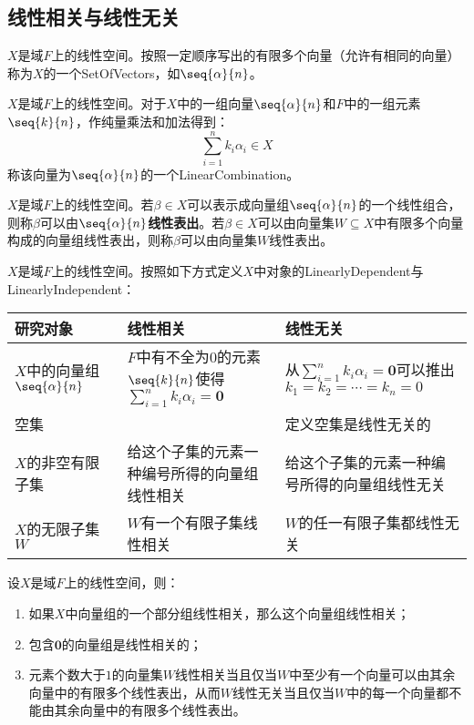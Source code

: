 \subsection{线性相关与线性无关}
\begin{definition}
	$X$是域$F$上的线性空间。按照一定顺序写出的有限多个向量（允许有相同的向量）称为$X$的一个\gls{SetOfVectors}，如$\seq{\alpha}{n}$。
\end{definition}
\begin{definition}
	$X$是域$F$上的线性空间。对于$X$中的一组向量$\seq{\alpha}{n}$和$F$中的一组元素$\seq{k}{n}$，作纯量乘法和加法得到：
	\begin{equation*}
		\sum_{i=1}^{n}k_i\alpha_i\in X
	\end{equation*}
	称该向量为$\seq{\alpha}{n}$的一个\gls{LinearCombination}。
\end{definition}
\begin{definition}
	$X$是域$F$上的线性空间。若$\beta\in X$可以表示成向量组$\seq{\alpha}{n}$的一个线性组合，则称$\beta$可以由$\seq{\alpha}{n}$\textbf{线性表出}。若$\beta\in X$可以由向量集$W\subseteq X$中有限多个向量构成的向量组线性表出，则称$\beta$可以由向量集$W$线性表出。
\end{definition}
\begin{definition}
	$X$是域$F$上的线性空间。按照如下方式定义$X$中对象的\gls{LinearlyDependent}与\gls{LinearlyIndependent}：
	\begin{table}[H]
		\centering
		\begin{tabular}{>{\centering\arraybackslash}p{4cm}|>{\centering\arraybackslash}p{5cm}|>{\centering\arraybackslash}p{6cm}}
			\toprule
			\textbf{研究对象} & \textbf{线性相关} & \textbf{线性无关} \\
			\midrule
			$X$中的向量组$\seq{\alpha}{n}$ & $F$中有不全为$0$的元素$\seq{k}{n}$使得$\sum\limits_{i=1}^{n}k_i\alpha_i=\mathbf{0}$ & 从$\sum\limits_{i=1}^{n}k_i\alpha_i=\mathbf{0}$可以推出$k_1=k_2=\cdots=k_n=0$ \\
			\hline
			空集 & & 定义空集是线性无关的\\
			\hline
			$X$的非空有限子集 & 给这个子集的元素一种编号所得的向量组线性相关 & 给这个子集的元素一种编号所得的向量组线性无关 \\
			\hline
			$X$的无限子集$W$ & $W$有一个有限子集线性相关 & $W$的任一有限子集都线性无关 \\
			\bottomrule
		\end{tabular}
	\end{table}
\end{definition}
\begin{property}\label{prop:LinearlyDependent}
	设$X$是域$F$上的线性空间，则：
	\begin{enumerate}
		\item 如果$X$中向量组的一个部分组线性相关，那么这个向量组线性相关；
		\item 包含$\mathbf{0}$的向量组是线性相关的；
		\item 元素个数大于$1$的向量集$W$线性相关当且仅当$W$中至少有一个向量可以由其余向量中的有限多个线性表出，从而$W$线性无关当且仅当$W$中的每一个向量都不能由其余向量中的有限多个线性表出。
	\end{enumerate}
\end{property}
